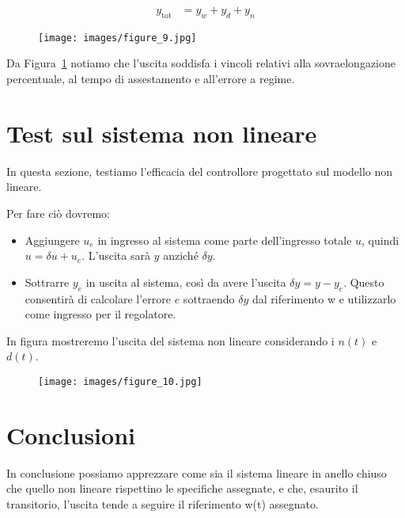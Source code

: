 \documentclass[a4paper, 11pt]{article}
\begin{document}
\begin{subequations}\label{eq:Risposta1}
\begin{align}
 y_{\text{tot}}&= y_w+y_d+y_n
\end{align}
\end{subequations}
\begin{figure}[H]
    \centering
\texttt{[image: images/figure\_9.jpg]}
    \caption{}
    \label{Figura8}
\end{figure}

Da Figura~\ref{Figura8} notiamo che l'uscita soddisfa i vincoli relativi alla sovraelongazione percentuale, al tempo di assestamento e all'errore a regime.

\section{Test sul sistema non lineare}

In questa sezione, testiamo l'efficacia del controllore progettato sul modello non lineare.

Per fare ciò dovremo:

\begin{itemize}
	\item[1)] Aggiungere $u_e$ in ingresso al sistema come parte dell'ingresso totale $u$, quindi $u = \delta u + u_e$. L'uscita sarà $y$ anziché $\delta y$.
 \\
        \item[2)]Sottrarre $y_e$ in uscita al sistema, così da avere l'uscita $\delta y = y - y_e$. Questo consentirà di calcolare l'errore $e$ sottraendo $\delta y$ dal riferimento w e utilizzarlo come ingresso per il regolatore.
\end{itemize}

In figura mostreremo l'uscita del sistema non lineare considerando i $n(t)$ e $d(t)$.
\begin{figure}[H]
    \centering
\texttt{[image: images/figure\_10.jpg]}
    \caption{}
    \label{Figura9}
\end{figure}
\section{Conclusioni}

In conclusione possiamo apprezzare come sia il sistema lineare in anello chiuso che quello non lineare rispettino le specifiche assegnate, e che, esaurito il transitorio, l'uscita tende a seguire il riferimento w(t) assegnato.
\end{document}
